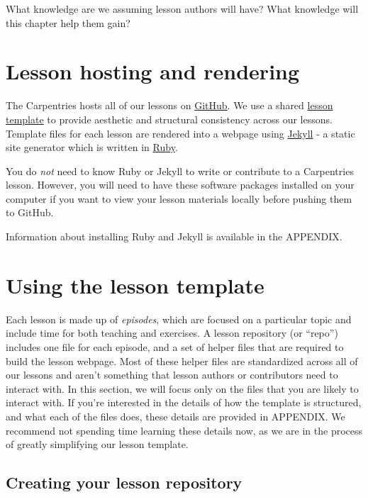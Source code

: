 \documentclass[
]{book}
\begin{document}
What knowledge are we assuming lesson authors will have?
What knowledge will this chapter help them gain?

\hypertarget{lesson-hosting-and-rendering}{%
\section{Lesson hosting and rendering}\label{lesson-hosting-and-rendering}}

The Carpentries hosts all of our lessons on \href{https://github.com}{GitHub}. We use a
shared \href{http://carpentries.github.io/lesson-example/setup.html}{lesson template} to provide aesthetic and structural
consistency across our lessons. Template files for each lesson are
rendered into a webpage using \href{https://jekyllrb.com/}{Jekyll} -
a static site generator which is written in \href{https://www.ruby-lang.org/en/}{Ruby}.

You do \emph{not} need to know Ruby or Jekyll to write
or contribute to a Carpentries lesson. However, you will need to
have these software packages installed on your computer if you
want to view your lesson materials locally before pushing them
to GitHub.

Information about installing Ruby and Jekyll is available in the APPENDIX.

\hypertarget{using-the-lesson-template}{%
\section{Using the lesson template}\label{using-the-lesson-template}}

Each lesson is made up of \emph{episodes}, which are focused on a
particular topic and
include time for both teaching and exercises. A lesson repository
(or ``repo'') includes one file for each episode,
and a set of helper files that are required to build
the lesson webpage. Most of these helper files are standardized
across all of our lessons and aren't something that lesson
authors or contributors need to interact with. In this section,
we will focus only on the files that you are likely to
interact with. If you're interested in the details
of how the template is structured, and what each of the files
does, these details are provided in APPENDIX. We recommend not
spending time learning these details now, as we are in the
process of greatly simplifying our lesson template.

\hypertarget{creating-your-lesson-repository}{%
\subsection{Creating your lesson repository}\label{creating-your-lesson-repository}}
\end{document}
